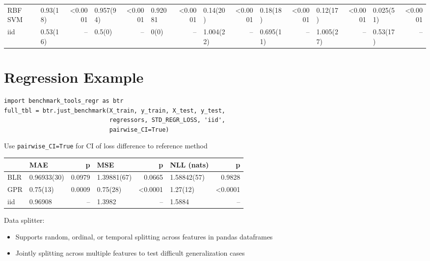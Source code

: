 \documentclass[a0,landscape]{a0poster}
\newcommand{\mysection}[1]{\section*{\fontsize{67.1}{82} \selectfont \color{NavyBlue} #1 \color{Black}}}
\newcommand{\code}{\texttt}
\begin{document}
\begin{multicols}{3}
\begin{center}
{\begin{tabular}{|l|l|r|l|r|l|r|l|r|l|r|l|r|l|r|}
RBF SVM           &  0.93(18)  &  <0.0001 &  0.957(94) &  <0.0001 &  0.92081 &  <0.0001 &  0.14(20)  &  <0.0001 &    0.18(18)  &  <0.0001 &  0.12(17)  &  <0.0001 &  0.025(51) &  <0.0001 \\
iid               &  0.53(16)  &     {--} &  0.5(0)    &     {--} &  0(0)    &     {--} &  1.004(22) &     {--} &    0.695(11) &     {--} &  1.005(27) &     {--} &  0.53(17)  &     {--} \\
\bottomrule
\end{tabular}
}
\end{center}

\mysection{Regression Example}

\begin{verbatim}
import benchmark_tools_regr as btr
full_tbl = btr.just_benchmark(X_train, y_train, X_test, y_test,
                              regressors, STD_REGR_LOSS, 'iid',
                              pairwise_CI=True)
\end{verbatim}
Use \code{pairwise\_CI=True} for CI of loss difference to reference method

\begin{tabular}{|l|l|r|l|r|l|r|}
\toprule
{}  &        {MAE} &     {p} &        {MSE} &      {p} & {NLL (nats)} &      {p} \\
\midrule
BLR &  0.96933(30) &  0.0979 &  1.39881(67) &   0.0665 &  1.58842(57) &   0.9828 \\
GPR &  0.75(13)    &  0.0009 &  0.75(28)    &  <0.0001 &  1.27(12)    &  <0.0001 \\
iid &  0.96908     &    {--} &  1.3982      &     {--} &  1.5884      &     {--} \\
\bottomrule
\end{tabular}

Data splitter:
\begin{itemize}
  \item Supports random, ordinal, or temporal splitting across features in pandas dataframes
  \item Jointly splitting across multiple features to test difficult generalization cases
\end{itemize}


\end{multicols}
\end{document}
